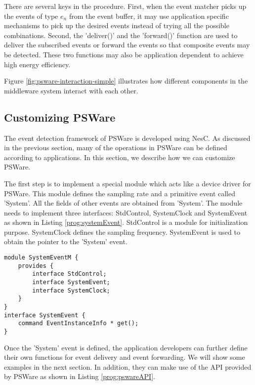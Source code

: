 There are several keys in the procedure. First, when the event matcher picks up the events of type \(e_n\) from the event buffer, it may use application specific mechanisms to pick up the desired events instead of trying all the possible combinations. Second, the 'deliver()' and the 'forward()' function are used to deliver the subscribed events or forward the events so that composite events may be detected. These two functions may also be application dependent to achieve high energy efficiency.

Figure \ref{fig:psware-interaction-simple} illustrates how different components in the middleware system interact with each other.

\subsection{Customizing PSWare}
The event detection framework of PSWare is developed using NesC. As discussed in the previous section, many of the operations in PSWare can be defined according to applications. In this section, we describe how we can customize PSWare.

The first step is to implement a special module which acts like a device driver for PSWare. This module defines the sampling rate and a primitive event called 'System'. All the fields of other events are obtained from 'System'. The module needs to implement three interfaces: StdControl, SystemClock and SystemEvent as shown in Listing \ref{prog:systemEvent}. StdControl is a module for initialization purpose. SystemClock defines the sampling frequency. SystemEvent is used to obtain the pointer to the 'System' event.

\begin{lstlisting}[caption=API of the 'System' event, label=prog:systemEvent]
module SystemEventM {
	provides {
		interface StdControl;
		interface SystemEvent;
		interface SystemClock;
	}
}
interface SystemEvent {
	command EventInstanceInfo * get();
}
\end{lstlisting}

Once the 'System' event is defined, the application developers can further define their own functions for event delivery and event forwarding. We will show some examples in the next section. In addition, they can make use of the API provided by PSWare as shown in Listing \ref{prog:pswareAPI}.

